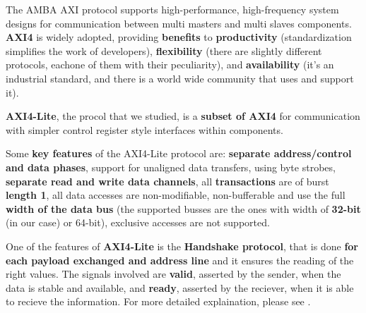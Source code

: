 {}

The AMBA AXI protocol supports high-performance, high-frequency system designs for communication between
multi masters and multi slaves components.
{\bf AXI4} is widely adopted, providing {\bf benefits} to {\bf productivity} (standardization simplifies the work of developers), {\bf flexibility} (there are slightly different protocols, eachone of them with their peculiarity), and {\bf availability} (it's an industrial standard, and there is a world wide community that uses and support it).
\newline

{\bf AXI4-Lite}, the procol that we studied, is a {\bf subset of AXI4} for communication with simpler control register style interfaces within components.
\newline

Some {\bf key features} of the AXI4-Lite protocol are: {\bf separate address/control and data phases}, support for unaligned data transfers, using byte strobes, {\bf separate read and write data channels}, all {\bf transactions} are of burst {\bf length 1}, all data accesses are non-modifiable, non-bufferable and use the full {\bf width of the data bus} (the supported busses are the ones with width of {\bf 32-bit} (in our case) or 64-bit), exclusive accesses are not supported.
\newline

One of the features of {\bf AXI4-Lite} is the {\bf Handshake protocol}, that is done {\bf for each payload exchanged and address line} and it ensures the reading of the right values. The signals involved are {\bf valid}, asserted by the sender, when the data is stable and available, and {\bf ready}, asserted by the reciever, when it is able to recieve the information. For more detailed explaination, please see \cite[Section-A3.2.1]{AXISpecification}.

